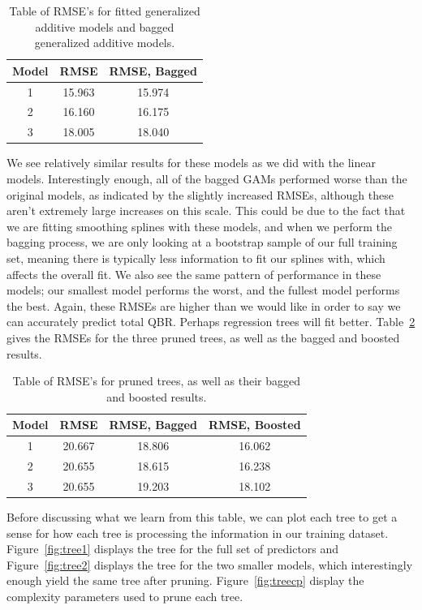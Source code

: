 \documentclass[12pt]{article}\usepackage[]{graphicx}\usepackage[]{color}
\begin{document}
\begin{table}[h]
\centering
\begin{tabular}{|c|c|c|}
\hline
Model & RMSE & RMSE, Bagged \\
\hline
1 & 15.963 & 15.974 \\
\hline
2 & 16.160 & 16.175 \\
\hline
3 & 18.005 & 18.040 \\
\hline
\end{tabular}
\captionsetup{font=footnotesize,labelfont=footnotesize}
\caption{\label{tab:gamres} Table of RMSE's for fitted generalized additive models and bagged generalized additive models.}
\end{table}

We see relatively similar results for these models as we did with the linear models. Interestingly enough, all of the bagged GAMs performed worse than the original models, as indicated by the slightly increased RMSEs, although these aren't extremely large increases on this scale. This could be due to the fact that we are fitting smoothing splines with these models, and when we perform the bagging process, we are only looking at a bootstrap sample of our full training set, meaning there is typically less information to fit our splines with, which affects the overall fit. We also see the same pattern of performance in these models; our smallest model performs the worst, and the fullest model performs the best. Again, these RMSEs are higher than we would like in order to say we can accurately predict total QBR. Perhaps regression trees will fit better. Table~\ref{tab:treeres} gives the RMSEs for the three pruned trees, as well as the bagged and boosted results.\\

\begin{table}[h]
\centering
\begin{tabular}{|c|c|c|c|}
\hline
Model & RMSE & RMSE, Bagged & RMSE, Boosted \\
\hline
1 & 20.667 & 18.806 & 16.062\\
\hline
2 & 20.655 & 18.615 & 16.238\\
\hline
3 & 20.655 & 19.203 & 18.102\\
\hline
\end{tabular}
\captionsetup{font=footnotesize,labelfont=footnotesize}
\caption{\label{tab:treeres} Table of RMSE's for pruned trees, as well as their bagged and boosted results.}
\end{table}

Before discussing what we learn from this table, we can plot each tree to get a sense for how each tree is processing the information in our training dataset. Figure~\ref{fig:tree1} displays the tree for the full set of predictors and Figure~\ref{fig:tree2} displays the tree for the two smaller models, which interestingly enough yield the same tree after pruning. Figure~\ref{fig:treecp} display the complexity parameters used to prune each tree.\\
\newpage
\end{document}
